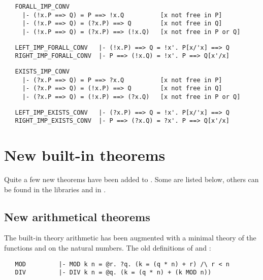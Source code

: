 \begin{hol}\begin{verbatim}
   FORALL_IMP_CONV
     |- (!x.P ==> Q) = P ==> !x.Q          [x not free in P]
     |- (!x.P ==> Q) = (?x.P) ==> Q        [x not free in Q]
     |- (!x.P ==> Q) = (?x.P) ==> (!x.Q)   [x not free in P or Q]
\end{verbatim}\end{hol}

\begin{hol}\begin{verbatim}
   LEFT_IMP_FORALL_CONV   |- (!x.P) ==> Q = !x'. P[x/'x] ==> Q
   RIGHT_IMP_FORALL_CONV  |- P ==> (!x.Q) = !x'. P ==> Q[x'/x]
\end{verbatim}\end{hol}

\begin{hol}\begin{verbatim}
   EXISTS_IMP_CONV
     |- (?x.P ==> Q) = P ==> ?x.Q          [x not free in P]
     |- (?x.P ==> Q) = (!x.P) ==> Q        [x not free in Q]
     |- (?x.P ==> Q) = (!x.P) ==> (?x.Q)   [x not free in P or Q]
\end{verbatim}\end{hol}

\begin{hol}\begin{verbatim}
   LEFT_IMP_EXISTS_CONV   |- (?x.P) ==> Q = !x'. P[x/'x] ==> Q
   RIGHT_IMP_EXISTS_CONV  |- P ==> (?x.Q) = ?x'. P ==> Q[x'/x]
\end{verbatim}\end{hol}

\section{New built-in theorems}\label{THEOREMS}

Quite a few new theorems have been added to \HOL.  Some are listed
below, others can be found in the libraries and in .

\subsection{New arithmetical theorems}

The built-in theory arithmetic has been augmented with a minimal theory of
the functions  and  on the natural numbers.  The old definitions of
 and :

\begin{hol}\begin{verbatim}
   MOD         |- MOD k n = @r. ?q. (k = (q * n) + r) /\ r < n
   DIV         |- DIV k n = @q. (k = (q * n) + (k MOD n))
\end{verbatim}\end{hol}

